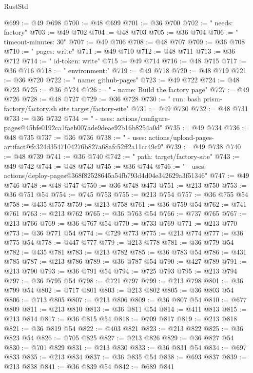\begin{lexlean}{RustStd}
\begin{coremodule}
@699 := @49 @698
@700 := @48 @699
@701 := @36 @700
@702 := "    needs: factory"
@703 := @49 @702
@704 := @48 @703
@705 := @36 @704
@706 := "    timeout-minutes: 30"
@707 := @49 @706
@708 := @48 @707
@709 := @36 @708
@710 := "      pages: write"
@711 := @49 @710
@712 := @48 @711
@713 := @36 @712
@714 := "      id-token: write"
@715 := @49 @714
@716 := @48 @715
@717 := @36 @716
@718 := "    environment:"
@719 := @49 @718
@720 := @48 @719
@721 := @36 @720
@722 := "      name: github-pages"
@723 := @49 @722
@724 := @48 @723
@725 := @36 @724
@726 := "      - name: Build the factory page"
@727 := @49 @726
@728 := @48 @727
@729 := @36 @728
@730 := "        run: bash prism-factory/factory.sh site target/factory-site"
@731 := @49 @730
@732 := @48 @731
@733 := @36 @732
@734 := "      - uses: actions/configure-pages@45bfe0192ca1faeb007ade9deae92b16b8254a0d"
@735 := @49 @734
@736 := @48 @735
@737 := @36 @736
@738 := "      - uses: actions/upload-pages-artifact@fc324d3547104276b827a68afc52ff2a11cc49c9"
@739 := @49 @738
@740 := @48 @739
@741 := @36 @740
@742 := "          path: target/factory-site"
@743 := @49 @742
@744 := @48 @743
@745 := @36 @744
@746 := "      - uses: actions/deploy-pages@368f82528645a54fb793d4d04e342629a3f51346"
@747 := @49 @746
@748 := @48 @747
@750 := @36 @748 @473
@751 := @213 @750
@753 := @36 @751 @54
@754 := @745 @753
@755 := @213 @754
@757 := @36 @755 @54
@758 := @435 @757
@759 := @213 @758
@761 := @36 @759 @54
@762 := @741 @761
@763 := @213 @762
@765 := @36 @763 @54
@766 := @737 @765
@767 := @213 @766
@769 := @36 @767 @54
@770 := @733 @769
@771 := @213 @770
@773 := @36 @771 @54
@774 := @729 @773
@775 := @213 @774
@777 := @36 @775 @54
@778 := @447 @777
@779 := @213 @778
@781 := @36 @779 @54
@782 := @435 @781
@783 := @213 @782
@785 := @36 @783 @54
@786 := @431 @785
@787 := @213 @786
@789 := @36 @787 @54
@790 := @427 @789
@791 := @213 @790
@793 := @36 @791 @54
@794 := @725 @793
@795 := @213 @794
@797 := @36 @795 @54
@798 := @721 @797
@799 := @213 @798
@801 := @36 @799 @54
@802 := @717 @801
@803 := @213 @802
@805 := @36 @803 @54
@806 := @713 @805
@807 := @213 @806
@809 := @36 @807 @54
@810 := @677 @809
@811 := @213 @810
@813 := @36 @811 @54
@814 := @411 @813
@815 := @213 @814
@817 := @36 @815 @54
@818 := @709 @817
@819 := @213 @818
@821 := @36 @819 @54
@822 := @403 @821
@823 := @213 @822
@825 := @36 @823 @54
@826 := @705 @825
@827 := @213 @826
@829 := @36 @827 @54
@830 := @701 @829
@831 := @213 @830
@833 := @36 @831 @54
@834 := @697 @833
@835 := @213 @834
@837 := @36 @835 @54
@838 := @693 @837
@839 := @213 @838
@841 := @36 @839 @54
@842 := @689 @841

\end{coremodule}
\end{lexlean}
